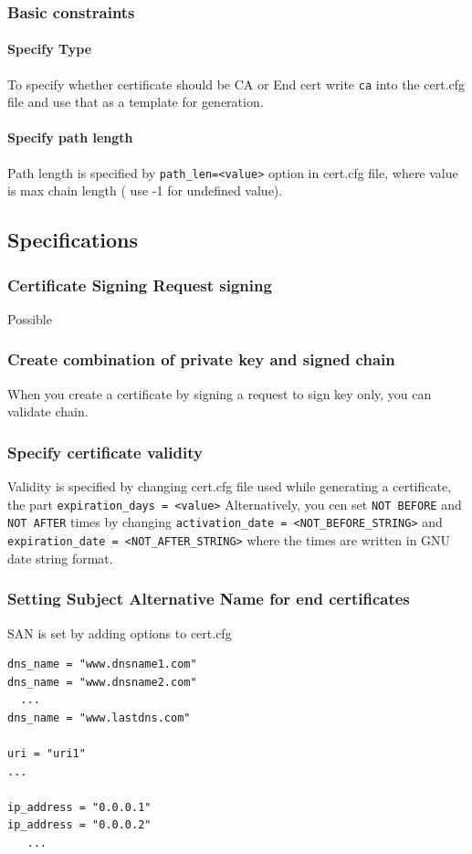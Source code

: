 \documentclass[10pt, a4paper]{report}
\begin{document}
  \subsubsection{Basic constraints}
    
      \paragraph{Specify Type}
To specify whether certificate should be CA or End cert write \verb+ca+ into the cert.cfg file and use that as a template for generation. 
      \paragraph{Specify path length}
Path length is specified by \verb+path_len=<value>+ option in cert.cfg file, where value is max chain length ( use -1 for undefined value).

  \subsection{Specifications}
  
    \subsubsection{Certificate Signing Request signing}
Possible %
    \subsubsection{Create combination of private key and signed chain}
When you create a certificate by signing a request to sign key only, you can validate chain. %
    \subsubsection{Specify certificate validity}
Validity is specified by changing cert.cfg file used while generating a certificate, the part \verb+expiration_days = <value>+
Alternatively, you cen set \verb+NOT BEFORE+ and \verb+NOT AFTER+ times by changing \verb+activation_date = <NOT_BEFORE_STRING>+ and \verb+expiration_date = <NOT_AFTER_STRING>+ where the times are written in GNU date string format.

    \subsubsection{Setting Subject Alternative Name for end certificates}
SAN is set by adding options to cert.cfg
\begin{verbatim}
dns_name = "www.dnsname1.com"
dns_name = "www.dnsname2.com"
  ...
dns_name = "www.lastdns.com"

uri = "uri1"
...

ip_address = "0.0.0.1"
ip_address = "0.0.0.2"
   ...
\end{verbatim}    
\end{document}

